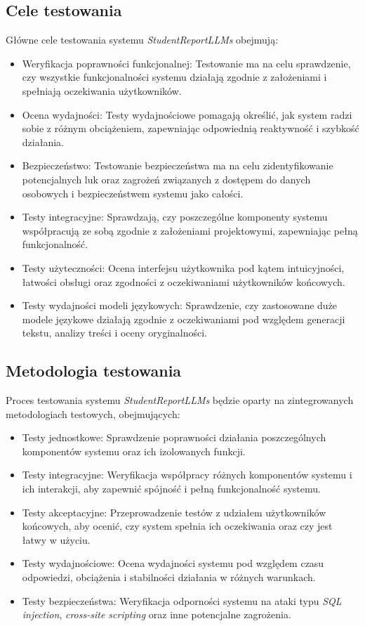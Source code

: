 \documentclass[a4paper, 12pt]{article}
\begin{document}
\subsection{Cele testowania}

Główne cele testowania systemu \textit{StudentReportLLMs} obejmują:

\begin{itemize}
\item Weryfikacja poprawności funkcjonalnej: Testowanie ma na celu sprawdzenie, czy wszystkie funkcjonalności systemu działają zgodnie z założeniami i spełniają oczekiwania użytkowników.
\item Ocena wydajności: Testy wydajnościowe pomagają określić, jak system radzi sobie z różnym obciążeniem, zapewniając odpowiednią reaktywność i szybkość działania.
\item Bezpieczeństwo: Testowanie bezpieczeństwa ma na celu zidentyfikowanie potencjalnych luk oraz zagrożeń związanych z dostępem do danych osobowych i bezpieczeństwem systemu jako całości.
\item Testy integracyjne: Sprawdzają, czy poszczególne komponenty systemu współpracują ze sobą zgodnie z założeniami projektowymi, zapewniając pełną funkcjonalność.
\item Testy użyteczności: Ocena interfejsu użytkownika pod kątem intuicyjności, łatwości obsługi oraz zgodności z oczekiwaniami użytkowników końcowych.
\item Testy wydajności modeli językowych: Sprawdzenie, czy zastosowane duże modele językowe działają zgodnie z oczekiwaniami pod względem generacji tekstu, analizy treści i oceny oryginalności.
\end{itemize}

\subsection{Metodologia testowania}

Proces testowania systemu \textit{StudentReportLLMs} będzie oparty na zintegrowanych metodologiach testowych, obejmujących:

\begin{itemize}
\item Testy jednostkowe: Sprawdzenie poprawności działania poszczególnych komponentów systemu oraz ich izolowanych funkcji.
\item Testy integracyjne: Weryfikacja współpracy różnych komponentów systemu i ich interakcji, aby zapewnić spójność i pełną funkcjonalność systemu.
\item Testy akceptacyjne: Przeprowadzenie testów z udziałem użytkowników końcowych, aby ocenić, czy system spełnia ich oczekiwania oraz czy jest łatwy w użyciu.
\item Testy wydajnościowe: Ocena wydajności systemu pod względem czasu odpowiedzi, obciążenia i stabilności działania w różnych warunkach.
\item Testy bezpieczeństwa: Weryfikacja odporności systemu na ataki typu \textit{SQL injection}, \textit{cross-site scripting} oraz inne potencjalne zagrożenia.
\end{itemize}
\end{document}
